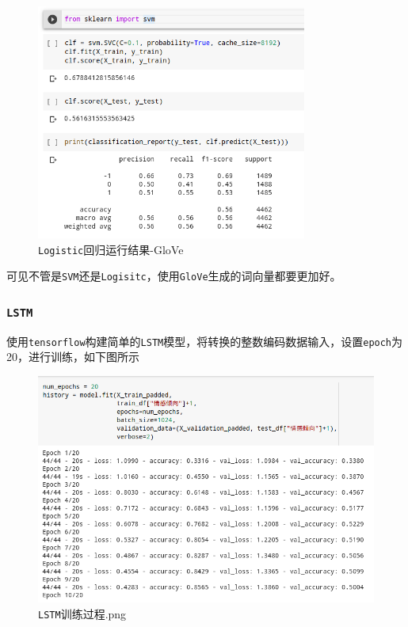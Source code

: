 \documentclass[UTF8]{ctexart}
\begin{document}
\begin{figure}[htb]
    \centering
    \includegraphics[width=3.5in]{asset/SVM_glove.png}
    \caption{\lstinline{Logistic}回归运行结果-GloVe} 
\end{figure}

可见不管是\lstinline{SVM}还是\lstinline{Logisitc}，使用\lstinline{GloVe}生成的词向量都要更加好。
\newpage
\subsubsection{\lstinline{LSTM}}

使用\lstinline{tensorflow}构建简单的\lstinline{LSTM}模型，将转换的整数编码数据输入，设置\lstinline{epoch}为20，进行训练，如下图所示

\begin{figure}[htb]
    \centering
    \includegraphics[width=5in]{asset/LSTM训练过程.png}
    \caption{\lstinline{LSTM}训练过程.png} 
\end{figure}
\end{document}
